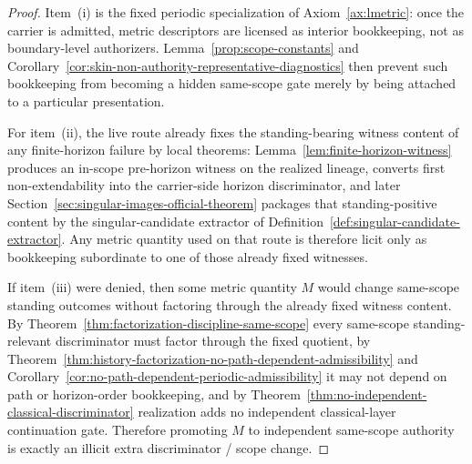 \begin{proof}
Item~(i) is the fixed periodic specialization of Axiom~\ref{ax:lmetric}: once the carrier is admitted, metric descriptors are licensed as interior bookkeeping, not as boundary-level authorizers. Lemma~\ref{prop:scope-constants} and Corollary~\ref{cor:skin-non-authority-representative-diagnostics} then prevent such bookkeeping from becoming a hidden same-scope gate merely by being attached to a particular presentation.

For item~(ii), the live route already fixes the standing-bearing witness content of any finite-horizon failure by local theorems: Lemma~\ref{lem:finite-horizon-witness} produces an in-scope pre-horizon witness on the realized lineage, \HorizonDetectabilityRef{} converts first non-extendability into the carrier-side horizon discriminator, and later Section~\ref{sec:singular-images-official-theorem} packages that standing-positive content by the singular-candidate extractor of Definition~\ref{def:singular-candidate-extractor}. Any metric quantity used on that route is therefore licit only as bookkeeping subordinate to one of those already fixed witnesses.

If item~(iii) were denied, then some metric quantity $M$ would change same-scope standing outcomes without factoring through the already fixed witness content. By Theorem~\ref{thm:factorization-discipline-same-scope} every same-scope standing-relevant discriminator must factor through the fixed quotient, by Theorem~\ref{thm:history-factorization-no-path-dependent-admissibility} and Corollary~\ref{cor:no-path-dependent-periodic-admissibility} it may not depend on path or horizon-order bookkeeping, and by Theorem~\ref{thm:no-independent-classical-discriminator} realization adds no independent classical-layer continuation gate. Therefore promoting $M$ to independent same-scope authority is exactly an illicit extra discriminator / scope change.
\end{proof}

